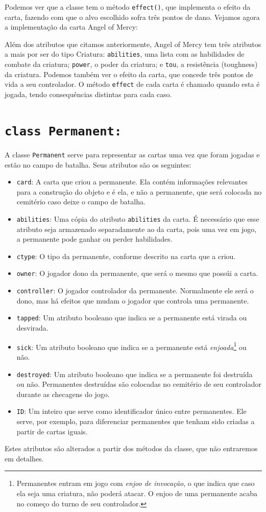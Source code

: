 Podemos ver que a classe tem o método \texttt{effect()}, que implementa o efeito da carta,
fazendo com que o alvo escolhido sofra três pontos de dano. Vejamos agora a implementação
da carta Angel of Mercy:
\begin{figure}
  
\end{figure}
Além dos atributos que citamos anteriormente, Angel of Mercy tem três atributos a mais por
ser do tipo Criatura: \texttt{abilities}, uma lista com as habilidades de combate da criatura;
\texttt{power}, o poder da criatura; e \texttt{tou}, a resistência (toughness) da criatura.
Podemos também ver o efeito da carta, que concede três pontos de vida a seu controlador. O método \texttt{effect} de cada carta é chamado quando esta é jogada, tendo consequências distintas para cada caso.

\section{\texttt{class Permanent:}}
A classe \texttt{Permanent} serve para representar as cartas uma vez que foram jogadas
e estão no campo de batalha. Seus atributos são os seguintes:
\begin{itemize}
  \item\texttt{card}: A carta que criou a permanente. Ela contém informações relevantes
  para a construção do objeto e é ela, e não a permanente, que será colocada no cemitério
  caso deixe o campo de batalha.
  \item\texttt{abilities}: Uma cópia do atributo \texttt{abilities} da carta. É necessário
  que esse atributo seja armazenado separadamente ao da carta, pois uma vez em jogo, a
  permanente pode ganhar ou perder habilidades.
  \item\texttt{ctype}: O tipo da permanente, conforme descrito na carta que a criou.
  \item\texttt{owner}: O jogador dono da permanente, que será o mesmo que possúi a carta.
  \item\texttt{controller}: O jogador controlador da permanente. Normalmente ele será o dono,
  mas há efeitos que mudam o jogador que controla uma permanente.
  \item\texttt{tapped}: Um atributo booleano que indica se a permanente está virada ou
  desvirada.
  \item\texttt{sick}: Um atributo booleano que indica se a permanente está
  \textit{enjoada}\footnote{Permanentes entram em jogo com \textit{enjoo de invocação}, o que
  indica que caso ela seja uma criatura, não poderá atacar. O enjoo de uma permanente acaba no
  começo do turno de seu controlador.} ou não.
  \item\texttt{destroyed}: Um atributo booleano que indica se a permanente foi destruída ou não.
  Permanentes destruídas são colocadas no cemitério de seu controlador durante as checagens do jogo.
  \item\texttt{ID}: Um inteiro que serve como identificador único entre permanentes. Ele serve,
  por exemplo, para diferenciar permanentes que tenham sido criadas a partir de cartas iguais.
\end{itemize}
Estes atributos são alterados a partir dos métodos da classe, que não entraremos em detalhes.

